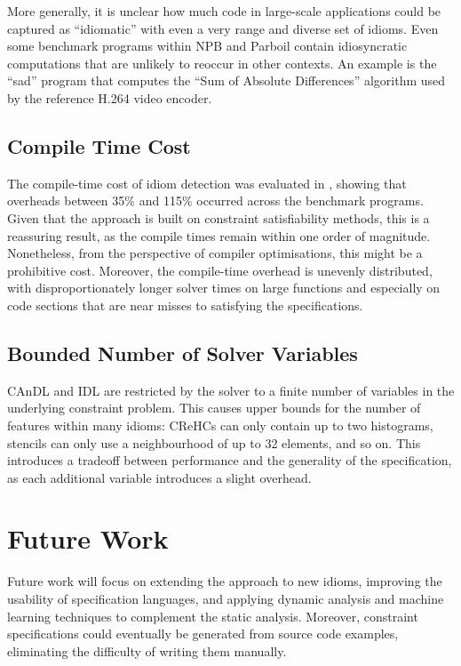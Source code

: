     More generally, it is unclear how much code in large-scale applications
    could be captured as ``idiomatic'' with even a very range and diverse set of
    idioms.
    Even some benchmark programs within NPB and Parboil contain idiosyncratic
    computations that are unlikely to reoccur in other contexts.
    An example is the ``sad'' program that computes the
    ``Sum of Absolute Differences'' algorithm used by the reference H.264 video
    encoder.

\subsection*{Compile Time Cost}

    The compile-time cost of idiom detection was evaluated in
    , showing that overheads between 35$\%$ and 115$\%$
    occurred across the benchmark programs.
    Given that the approach is built on constraint satisfiability methods, this
    is a reassuring result, as the compile times remain within one order of
    magnitude.
    Nonetheless, from the perspective of compiler optimisations, this might be
    a prohibitive cost.
    Moreover, the compile-time overhead is unevenly distributed, with
    disproportionately longer solver times on large functions and especially on
    code sections that are near misses to satisfying the specifications.

\subsection*{Bounded Number of Solver Variables}

    CAnDL and IDL are restricted by the solver to a finite number of variables
    in the underlying constraint problem.
    This causes upper bounds for the number of features within many idioms:
    CReHCs can only contain up to two histograms, stencils can only use a
    neighbourhood of up to 32 elements, and so on.
    This introduces a tradeoff between performance and the generality of the
    specification, as each additional variable introduces a slight overhead.

\section{Future Work}

    Future work will focus on extending the approach to new idioms,
    improving the usability of specification languages, and applying dynamic
    analysis and machine learning techniques to complement the static analysis.
    Moreover, constraint specifications could eventually be generated from
    source code examples, eliminating the difficulty of writing them manually.

